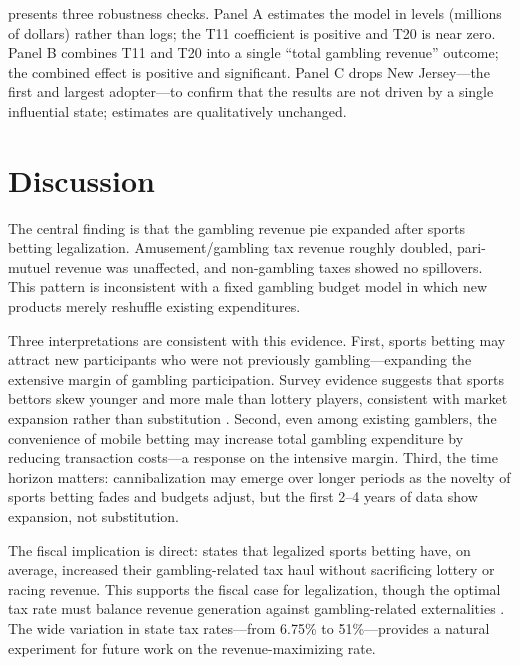 \documentclass[12pt]{article}
\begin{document}
 presents three robustness checks. Panel A estimates the model in levels (millions of dollars) rather than logs; the T11 coefficient is positive and T20 is near zero. Panel B combines T11 and T20 into a single ``total gambling revenue'' outcome; the combined effect is positive and significant. Panel C drops New Jersey---the first and largest adopter---to confirm that the results are not driven by a single influential state; estimates are qualitatively unchanged.



\section{Discussion}

The central finding is that the gambling revenue pie expanded after sports betting legalization. Amusement/gambling tax revenue roughly doubled, pari-mutuel revenue was unaffected, and non-gambling taxes showed no spillovers. This pattern is inconsistent with a fixed gambling budget model in which new products merely reshuffle existing expenditures.

Three interpretations are consistent with this evidence. First, sports betting may attract new participants who were not previously gambling---expanding the extensive margin of gambling participation. Survey evidence suggests that sports bettors skew younger and more male than lottery players, consistent with market expansion rather than substitution \citep{gainsbury2015review}. Second, even among existing gamblers, the convenience of mobile betting may increase total gambling expenditure by reducing transaction costs---a response on the intensive margin. Third, the time horizon matters: cannibalization may emerge over longer periods as the novelty of sports betting fades and budgets adjust, but the first 2--4 years of data show expansion, not substitution.

The fiscal implication is direct: states that legalized sports betting have, on average, increased their gambling-related tax haul without sacrificing lottery or racing revenue. This supports the fiscal case for legalization, though the optimal tax rate must balance revenue generation against gambling-related externalities \citep{allcott2019regressive}. The wide variation in state tax rates---from 6.75\% to 51\%---provides a natural experiment for future work on the revenue-maximizing rate.
\end{document}
